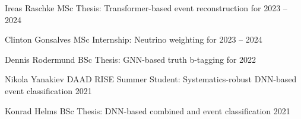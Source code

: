 


\begin{cvhonors}

  \cvhonor
    {Ireas Raschke} %
    {%
      MSc Thesis:\newline
      Transformer-based event reconstruction for \ttHWW  %
    } %
    {} %
    {2023 -- 2024} %

  \cvhonor
    {Clinton Gonsalves} %
    {%
      MSc Internship:\newline
      Neutrino weighting for \ttHWW  %
    } %
    {} %
    {2023 -- 2024} %

  \cvhonor
    {Dennis Rodermund} %
    {%
      BSc Thesis:\newline
      GNN-based truth b-tagging for \ttHbb  %
    } %
    {} %
    {2022} %

  \cvhonor
    {Nikola Yanakiev} %
    {%
      DAAD RISE Summer Student:\newline
      Systematics-robust DNN-based \ttHbb event classification  %
    } %
    {} %
    {2021} %

  \cvhonor
    {Konrad Helms} %
    {%
      BSc Thesis:\newline
      DNN-based combined \ttHbb and \tHbb event classification  %
    } %
    {} %
    {2021} %

\end{cvhonors}
